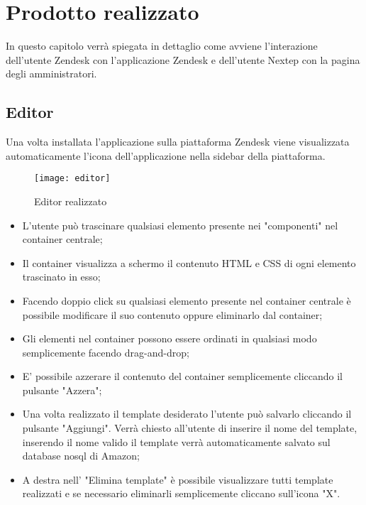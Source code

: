 
\chapter{Prodotto realizzato}
\label{cap:verifica-validazione}
In questo capitolo verrà spiegata in dettaglio come avviene l’interazione dell'utente Zendesk con l'applicazione
Zendesk e dell'utente Nextep con la pagina degli amministratori.

\section{Editor}
Una volta installata l'applicazione sulla piattaforma Zendesk viene visualizzata automaticamente l'icona dell'applicazione nella sidebar della piattaforma. 
\begin{figure}[!h] 
	\centering 
	\texttt{[image: editor]} 
	\caption{Editor realizzato }
\end{figure}
\begin{itemize}
	\item L'utente può trascinare qualsiasi elemento presente nei "componenti" nel container centrale;
	\item Il container visualizza a schermo il contenuto  HTML e CSS di ogni elemento trascinato in esso;
	\item Facendo doppio click su qualsiasi elemento presente nel container centrale è possibile modificare il suo contenuto oppure eliminarlo dal container;
	\item Gli elementi nel container possono essere ordinati in qualsiasi modo semplicemente facendo drag-and-drop;
	\item E' possibile azzerare il contenuto del container semplicemente cliccando il pulsante "Azzera";
	\item Una volta realizzato il template desiderato l'utente può salvarlo cliccando il pulsante "Aggiungi". Verrà chiesto all'utente di inserire il nome del template, inserendo il nome valido il template verrà automaticamente salvato sul database nosql di Amazon;
	\item A destra nell' "Elimina template" è possibile visualizzare tutti template realizzati e se necessario eliminarli semplicemente cliccano sull'icona "X".  
\end{itemize}
